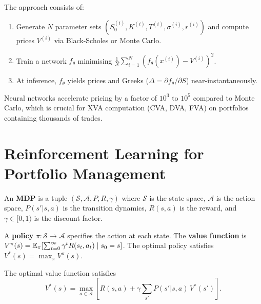 \begin{proposition}
The approach consists of:
\begin{enumerate}
    \item Generate $N$ parameter sets $(S_0^{(i)}, K^{(i)}, T^{(i)},
    \sigma^{(i)}, r^{(i)})$ and compute prices $V^{(i)}$ via Black-Scholes
    or Monte Carlo.
    \item Train a network $f_\theta$ minimising
    $\frac{1}{N}\sum_{i=1}^N (f_\theta(x^{(i)}) - V^{(i)})^2$.
    \item At inference, $f_\theta$ yields prices and Greeks
    ($\Delta = \partial f_\theta/\partial S$) near-instantaneously.
\end{enumerate}
\end{proposition}

\begin{remark}
Neural networks accelerate pricing by a factor of $10^3$ to $10^5$ compared
to Monte Carlo, which is crucial for XVA computation (CVA, DVA, FVA) on
portfolios containing thousands of trades.
\end{remark}

\section{Reinforcement Learning for Portfolio Management}

\begin{definition}
An \textbf{MDP} is a tuple $(\mathcal{S}, \mathcal{A}, P, R, \gamma)$ where
$\mathcal{S}$ is the state space, $\mathcal{A}$ is the action space,
$P(s'|s, a)$ is the transition dynamics, $R(s, a)$ is the reward, and
$\gamma \in [0, 1)$ is the discount factor.
\end{definition}

\begin{definition}
A \textbf{policy} $\pi : \mathcal{S} \to \mathcal{A}$ specifies the action at
each state. The \textbf{value function} is
$V^\pi(s) = \mathbb{E}_\pi\!\left[\sum_{t=0}^\infty \gamma^t R(s_t, a_t) \mid
s_0 = s\right]$. The optimal policy satisfies
$V^*(s) = \max_\pi V^\pi(s)$.
\end{definition}

\begin{theorem}
The optimal value function satisfies
\[
    V^*(s) = \max_{a \in \mathcal{A}} \left[R(s, a)
    + \gamma \sum_{s'} P(s'|s, a)\,V^*(s')\right].
\]
\end{theorem}

